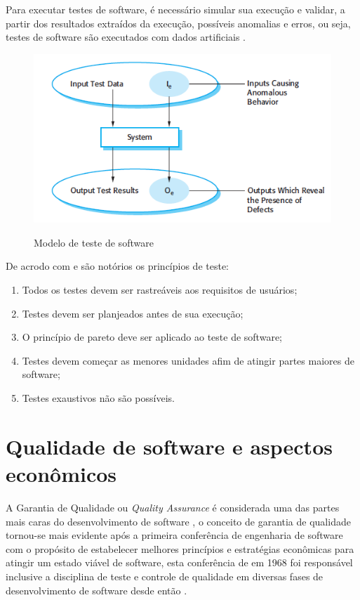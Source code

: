 \documentclass[
	12pt,				%
	oneside,			%
	a4paper,			%
	english,			%
	brazil				%
	]{abntex2ppgsi}
\begin{document}
Para executar testes de software, é necessário simular sua execução e validar, a partir dos resultados extraídos da execução, possíveis anomalias e erros, ou seja, testes de software são executados com dados artificiais \cite{Sommerville2010}.

\begin{figure}[H]%
	\centering
 	  \caption{Modelo de teste de software}
		\includegraphics{modelo-teste.png}
	\label{fig:tipos-custo-arvore}
\end{figure}

De acrodo com \cite{pressman2009engenharia} e \cite{Davis1995} são notórios os princípios de teste: 

\begin{enumerate}
\item Todos os testes devem ser rastreáveis aos requisitos de usuários;
\item Testes devem ser planjeados antes de sua execução;
\item O princípio de pareto deve ser aplicado ao teste de software;
\item Testes devem começar as menores unidades afim de atingir partes maiores de software;
\item Testes exaustivos não são possíveis.
\end{enumerate}


\section{Qualidade de software e aspectos econômicos}

A Garantia de Qualidade ou \textit{Quality Assurance} é considerada uma das partes mais caras do desenvolvimento de software \cite{wagner2005}, o conceito de garantia de qualidade tornou-se mais evidente após a primeira conferência de engenharia de software com o propósito de estabelecer melhores princípios e estratégias econômicas para atingir um estado viável de software, esta conferência de em 1968 foi responsável	 inclusive a disciplina de teste e controle de qualidade em diversas  fases de desenvolvimento de software desde então \cite{repasi2009}.
\end{document}
